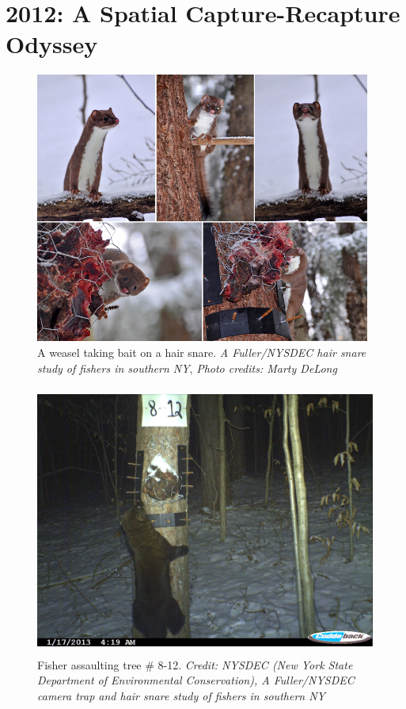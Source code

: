 \chapter{
2012: A Spatial Capture-Recapture Odyssey
}

\label{chapt.final}

\vspace{0.3cm}


\vspace{2in}



\begin{figure}[h!]
\centering
\includegraphics[height=3.5in]{Ch20-Last/Chp20picturearray.jpg}
\caption{
A weasel taking bait on a hair snare.
{\it A Fuller/NYSDEC hair snare study of fishers in
southern NY}, {\it Photo credits: Marty DeLong}
}
\label{last.fig.weasels}
\end{figure}


\begin{figure}[h!]
\centering
\includegraphics[height=3.5in]{Ch20-Last/fisher.jpg}
\caption{
Fisher assaulting tree \# 8-12.
{\it Credit: NYSDEC (New York State Department of Environmental Conservation),
A Fuller/NYSDEC camera trap and hair snare study of fishers in
southern NY}
}
\label{last.fig.fisher}
\end{figure}


